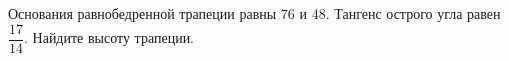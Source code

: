\begin{ex}
	\begin{condition}
		Основания равнобедренной трапеции равны \( 76  \) и \( 48 \). Тангенс острого угла равен  \( \dfrac{17}{14} \).  Найдите высоту трапеции.
	\end{condition}
\end{ex}